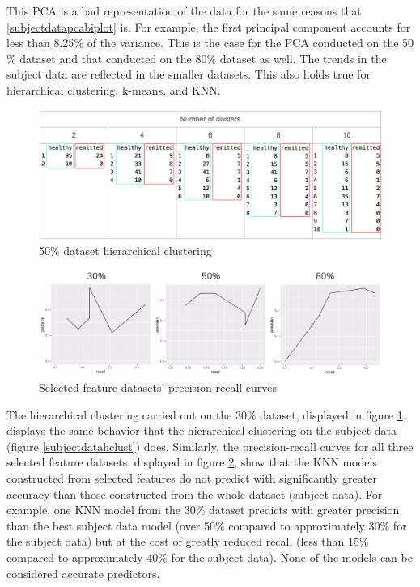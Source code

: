 \documentclass[12pt]{report}
\begin{document}
		This PCA is a bad representation of the data for the same reasons that \ref{subjectdatapcabiplot} is. For example, the first principal component accounts for less than 8.25$\%$ of the variance. This is the case for the PCA conducted on the 50$\%$ dataset and that conducted on the 80$\%$ dataset as well. The trends in the subject data are reflected in the smaller datasets. This also holds true for hierarchical clustering, k-means, and KNN.
		
		\begin{figure}[H]
			\centering
			\includegraphics[scale=0.3]{Images/rfe101_hclust.png}
			\caption{50$\%$ dataset hierarchical clustering}
			\label{rfe101hclust}
		\end{figure}
		
		\begin{figure}[H]
			\centering
			\includegraphics[scale=0.3]{Images/featureselection_precisionrecall.png}
			\caption{Selected feature datasets' precision-recall curves}
			\label{featureselectionprecisionrecall}
		\end{figure}
			
		The hierarchical clustering carried out on the 30$\%$ dataset, displayed in figure \ref{rfe101hclust}, displays the same behavior that the hierarchical clustering on the subject data (figure \ref{subjectdatahclust}) does. Similarly, the precision-recall curves for all three selected feature datasets, displayed in figure \ref{featureselectionprecisionrecall}, show that the KNN models constructed from selected features do not predict with significantly greater accuracy than those constructed from the whole dataset (subject data). For example, one KNN model from the 30$\%$ dataset predicts with greater precision than the best subject data model (over 50$\%$ compared to approximately 30$\%$ for the subject data) but at the cost of greatly reduced recall (less than 15$\%$ compared to approximately 40$\%$ for the subject data). None of the models can be considered accurate predictors.
		
\end{document}
